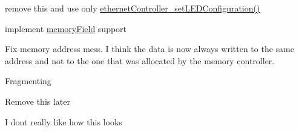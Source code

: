\begin{DoxyRefList}
%
remove this and use only \mbox{\hyperlink{group__leds_ga3ec0343a266cb8a4925097d708dd96f4}{ethernet\+Controller\+\_\+set\+L\+E\+D\+Configuration()}}  
\item[Global \mbox{\hyperlink{group__data__reception_ga5748b4be9f5e6936ab91753411a440d9}{ethernet\+Controller\+\_\+stream\+From\+R\+X\+Buffer}} (uint8\+\_\+t start\+End, uint16\+\_\+t $\ast$len, uint16\+\_\+t offset)]\label{todo__todo000009}%
%
implement \mbox{\hyperlink{structmemory_field}{memory\+Field}} support  
\item[Global \mbox{\hyperlink{group__data__transmission_ga9c0d9b39642cf6b7e220b9f0b44e3e02}{ethernet\+Controller\+\_\+stream\+To\+Transmit\+Buffer}} (uint8\+\_\+t data, uint16\+\_\+t len)]\label{todo__todo000001}%
%
Fix memory address mess. I think the data is now always written to the same address and not to the one that was allocated by the memory controller.  
\item[Global \mbox{\hyperlink{group__ipv4_ga9b32058fa6f24f692e0915345b3373b2}{ipv4\+\_\+stream\+To\+Transmission\+Buffer}} (uint8\+\_\+t data, ipv4\+\_\+packet\+\_\+t packet)]\label{todo__todo000015}%
%
Fragmenting  
\item[Global \mbox{\hyperlink{group__arp_gad629320d0e251b055167216baa76aff3}{print\+Arp\+Table}} ()]\label{todo__todo000014}%
%
Remove this later  
\item[Module \mbox{\hyperlink{group__rsv_bits}{rsv\+Bits}} ]\label{todo__todo000004}%
%
I don\textquotesingle{}t really like how this looks


\end{DoxyRefList}